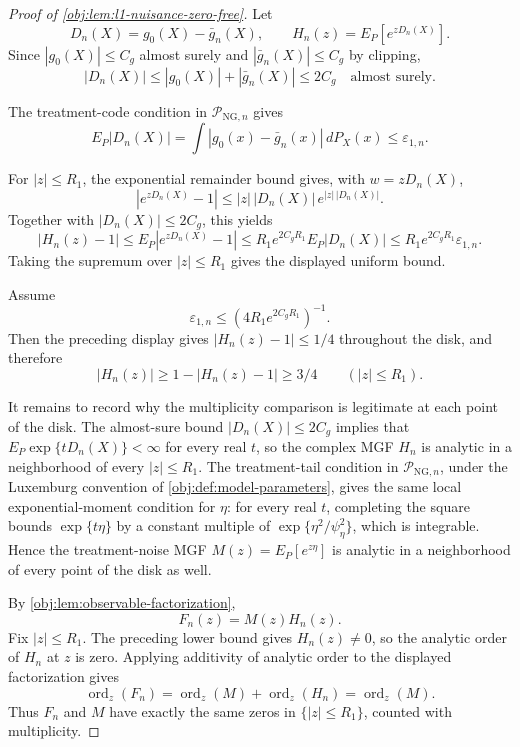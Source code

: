 \begin{proof}[Proof of \cref{obj:lem:l1-nuisance-zero-free}]
Let
\[
D_n(X)=g_0(X)-\bar g_n(X),
\qquad
H_n(z)=E_P[e^{zD_n(X)}].
\]
Since \(|g_0(X)|\le C_g\) almost surely and \(|\bar g_n(X)|\le C_g\) by
clipping,
\[
|D_n(X)|\le |g_0(X)|+|\bar g_n(X)|\le2C_g
\quad\text{almost surely}.
\]

The treatment-code condition in \(\mathcal P_{\mathrm{NG},n}\) gives
\[
E_P|D_n(X)|
=
\int |g_0(x)-\bar g_n(x)|\,dP_X(x)
\le
\varepsilon_{1,n}.
\]

For \(|z|\le R_1\), the exponential remainder bound gives, with
\(w=zD_n(X)\),
\[
|e^{zD_n(X)}-1|
\le
|z|\,|D_n(X)|\,e^{|z|\,|D_n(X)|}.
\]
Together with \(|D_n(X)|\le2C_g\), this yields
\[
|H_n(z)-1|
\le
E_P|e^{zD_n(X)}-1|
\le
R_1 e^{2C_gR_1}E_P|D_n(X)|
\le
R_1 e^{2C_gR_1}\varepsilon_{1,n}.
\]
Taking the supremum over \(|z|\le R_1\) gives the displayed uniform bound. %

Assume
\[
\varepsilon_{1,n}\le (4R_1e^{2C_gR_1})^{-1}.
\]
Then the preceding display gives \(|H_n(z)-1|\le1/4\) throughout the disk, and
therefore
\[
|H_n(z)|\ge 1-|H_n(z)-1|\ge3/4
\qquad(|z|\le R_1).
\]

It remains to record why the multiplicity comparison is legitimate at each
point of the disk.  The almost-sure bound \(|D_n(X)|\le2C_g\) implies that
\(E_P\exp\{tD_n(X)\}<\infty\) for every real \(t\), so the complex MGF
\(H_n\) is analytic in a neighborhood of every \(|z|\le R_1\).  The treatment-tail
condition in \(\mathcal P_{\mathrm{NG},n}\), under the Luxemburg convention of
\cref{obj:def:model-parameters}, gives the same local exponential-moment
condition for \(\eta\): for every real \(t\), completing the square bounds
\(\exp\{t\eta\}\) by a constant multiple of
\(\exp\{\eta^2/\psi_\eta^2\}\), which is integrable.  Hence the treatment-noise
MGF \(M(z)=E_P[e^{z\eta}]\) is analytic in a neighborhood of every point of the
disk as well. %

By \cref{obj:lem:observable-factorization},
\[
F_n(z)=M(z)H_n(z).
\]
Fix \(|z|\le R_1\).  The preceding lower bound gives \(H_n(z)\ne0\), so the
analytic order of \(H_n\) at \(z\) is zero.  Applying additivity of analytic
order to the displayed factorization gives
\[
\operatorname{ord}_z(F_n)
=
\operatorname{ord}_z(M)+\operatorname{ord}_z(H_n)
=
\operatorname{ord}_z(M).
\]
Thus \(F_n\) and \(M\) have exactly the same zeros in \(\{|z|\le R_1\}\), counted
with multiplicity. %
\end{proof}
